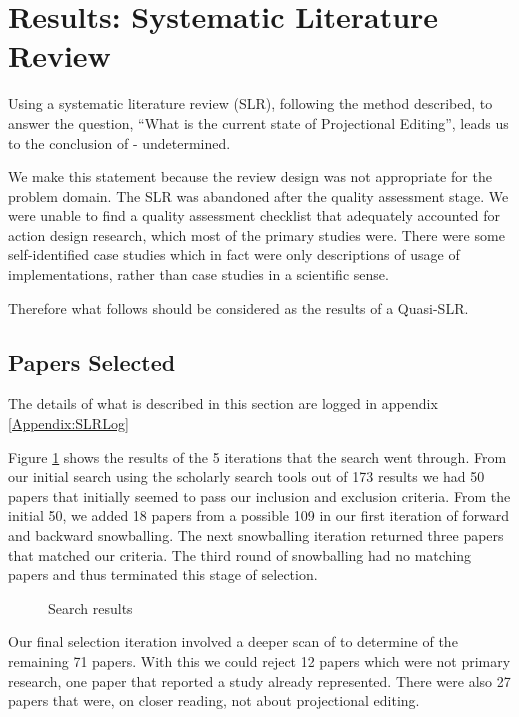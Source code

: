 \section{Results: Systematic Literature Review}\label{section:Results_SLR}

Using a systematic literature review (SLR), following the method described, to answer the question, ``What is the current state of Projectional Editing'', leads us to the conclusion of - undetermined.

We make this statement because the review design was not appropriate for the problem domain.
The SLR was abandoned after the quality assessment stage.
We were unable to find a quality assessment checklist that adequately accounted for action design research, which most of the primary studies were.
There were some self-identified case studies which in fact were only descriptions of usage of implementations, rather than case studies in a scientific sense.

Therefore what follows should be considered as the results of a Quasi-SLR.

\subsection{Papers Selected}
The details of what is described in this section are logged in appendix \ref{Appendix:SLRLog}

Figure \ref{fig:search_results} shows the results of the 5 iterations that the search went through.
From our initial search using the scholarly search tools out of 173 results we had 50 papers that initially seemed to pass our inclusion and exclusion criteria.
From the initial 50, we added 18 papers from a possible 109 in our first iteration of forward and backward snowballing.
The next snowballing iteration returned three papers that matched our criteria.
The third round of snowballing had no matching papers and thus terminated this stage of selection.

\begin{figure}[htbp]
    \centering
    \caption{Search results}
    \label{fig:search_results}
\end{figure}


Our final selection iteration involved a deeper scan of to determine of the remaining 71 papers.
With this we could reject 12 papers which were not primary research, one paper that reported a study already represented.
There were also 27 papers that were, on closer reading, not about projectional editing.

